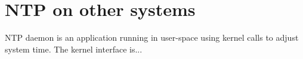 
\chapter{NTP on other systems}

NTP daemon is an application running in user-space using kernel calls to adjust system time.
The kernel interface is...




